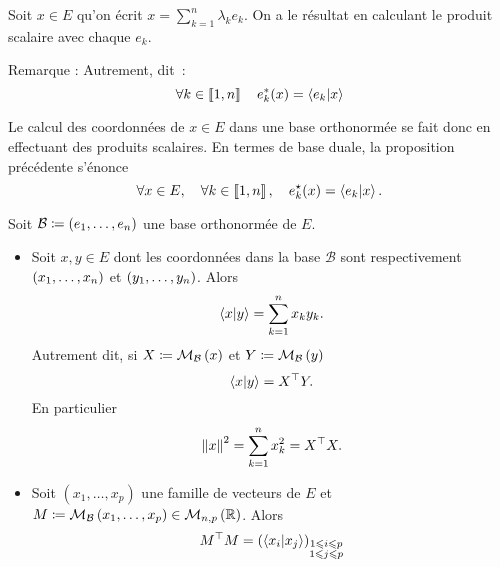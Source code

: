 \documentclass{magnolia}
\begin{document}
\begin{preuve}
Soit $x\in E$ qu'on écrit $x=\sum_{k=1}^n \lambda_k e_k$. On a le résultat en calculant le produit scalaire avec chaque $e_k$.
\end{preuve}

\begin{sol}
Remarque : 
Autrement, dit~:
 \[\forall k\in\left\llbracket 1,n\right\rrbracket \quad e_k^*(x)=\left\langle {e_k}\middle|{x}\right\rangle\]
\end{sol}

\begin{remarques}
\remarque Le calcul des coordonnées de $x\in E$ dans une base orthonormée se fait
  donc en effectuant des produits scalaires.
\remarque En termes de base duale, la proposition précédente s'énonce
  \[\forall x\in E,\quad \forall k\in\left\llbracket 1,n\right\rrbracket,\quad e_k^{\star}(x)=\left\langle {e_k}\middle|{x}\right\rangle.\]
\end{remarques}

\begin{proposition}[utile=-3]
Soit $\mathcal{B}\coloneqq\left(e_1,\ldots,e_n\right)$ une base orthonormée de $E$.
\begin{itemize}
\item Soit $x,y\in E$ dont les coordonnées dans la base $\mathcal{B}$ sont
  respectivement $\left(x_1,\ldots,x_n\right)$ et $\left(y_1,\ldots,y_n\right)$. Alors
  \[\left\langle {x}\middle|{y}\right\rangle=\sum_{k=1}^n x_k y_k.\]
  Autrement dit, si $X\coloneqq\mathcal{M}_{\mathcal{B}}\left(x\right)$ et $Y\coloneqq\mathcal{M}_{\mathcal{B}}\left(y\right)$
  \[\left\langle {x}\middle|{y}\right\rangle={X}^{\top}Y.\]
  En particulier
  \[\left\|x\right\|^2=\sum_{k=1}^n x_k^2={X}^{\top}X.\]
\item Soit $(x_1,\ldots,x_p)$ une famille de vecteurs de $E$ et
  $M\coloneqq\mathcal{M}_{\mathcal{B}}\left(x_1,\ldots,x_p\right)\in\mathcal{M}_{n,p}\left(\mathbb{R}\right)$. Alors
  \[{M}^{\top}M=\left(\left\langle {x_i}\middle|{x_j}\right\rangle\right)_{\substack{1\leqslant i\leqslant p\\ 1\leqslant j\leqslant p}}\]
\end{itemize}
\end{proposition}
\end{document}
